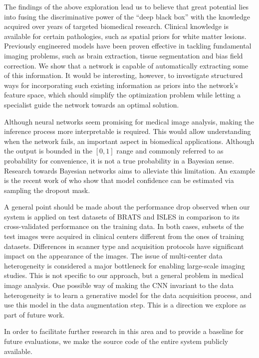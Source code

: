 \documentclass[preprint,authoryear,12pt]{elsarticle}
\newcommand{\quot}[1]{``#1''}
\begin{document}
The findings of the above exploration lead us to believe that great potential lies into fusing the discriminative power of the \quot{deep black box} with the knowledge acquired over years of targeted biomedical research. Clinical knowledge is available for certain pathologies, such as spatial priors for white matter lesions. Previously engineered models have been proven effective in tackling fundamental imaging problems, such as brain extraction, tissue segmentation and bias field correction. We show that a network is capable of automatically extracting some of this information. It would be interesting, however, to investigate structured ways for incorporating such existing information as priors into the network's feature space, which should simplify the optimization problem while letting a specialist guide the network towards an optimal solution.

Although neural networks seem promising for medical image analysis, making the inference process more interpretable is required. This would allow understanding when the network fails, an important aspect in biomedical applications. Although the output is bounded in the $[0,1]$ range and commonly referred to as probability for convenience, it is not a true probability in a Bayesian sense. Research towards Bayesian networks aims to alleviate this limitation. An example is the recent work of \cite{Gal2015} who show that model confidence can be estimated via sampling the dropout mask.

A general point should be made about the performance drop observed when our system is applied on test datasets of BRATS and ISLES in comparison to its cross-validated performance on the training data. In both cases, subsets of the test images were acquired in clinical centers different from the ones of training datasets. Differences in scanner type and acquisition protocols have significant impact on the appearance of the images. The issue of multi-center data heterogeneity is considered a major bottleneck for enabling large-scale imaging studies. This is not specific to our approach, but a general problem in medical image analysis. One possible way of making the CNN invariant to the data heterogeneity is to learn a generative model for the data acquisition process, and use this model in the data augmentation step. This is a direction we explore as part of future work.

In order to facilitate further research in this area and to provide a baseline for future evaluations, we make the source code of the entire system publicly available.
 
\end{document}
